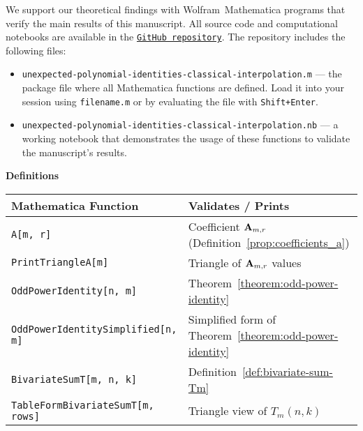 We support our theoretical findings with Wolfram~Mathematica programs that verify the main results of this manuscript.
All source code and computational notebooks are available in the
\href{https://github.com/kolosovpetro/surprising-polynomial-identities-classical-interpolation}
{\texttt{GitHub repository}}.
The repository includes the following files:
\begin{itemize}
    \item \texttt{unexpected-polynomial-identities-classical-interpolation.m} --- the package file where
    all Mathematica functions are defined.
    Load it into your session using \texttt{filename.m} or by evaluating the file with \texttt{Shift+Enter}.
    \item \texttt{unexpected-polynomial-identities-classical-interpolation.nb} --- a working notebook that demonstrates
    the usage of these functions to validate the manuscript’s results.
\end{itemize}

\textbf{Definitions}
\begin{center}
    \renewcommand{\arraystretch}{1.3}
    \begin{tabular}{ll}
        \toprule
        \textbf{Mathematica Function}             & \textbf{Validates / Prints}                                        \\
        \midrule
        \texttt{A[m, r]}                          & Coefficient ${\mathbf{A}} \sb{m,r}$ (Definition~\ref{prop:coefficients_a}) \\
        \texttt{PrintTriangleA[m]}                & Triangle of ${\mathbf{A}} \sb{m,r}$ values                                 \\
        \texttt{OddPowerIdentity[n, m]}           & Theorem~\ref{theorem:odd-power-identity}                           \\
        \texttt{OddPowerIdentitySimplified[n, m]} & Simplified form of Theorem~\ref{theorem:odd-power-identity}        \\
        \texttt{BivariateSumT[m, n, k]}           & Definition~\ref{def:bivariate-sum-Tm}                              \\
        \texttt{TableFormBivariateSumT[m, rows]}  & Triangle view of $T_m(n, k)$                                       \\
        \bottomrule
    \end{tabular}
\end{center}
\clearpage


